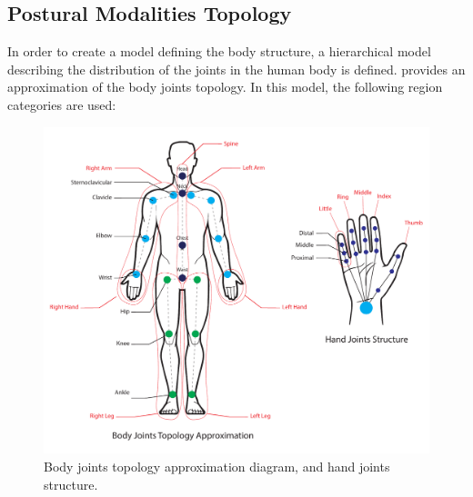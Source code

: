 \pagebreak
\subsection{Postural Modalities Topology}

In order to create a model defining the body structure, a hierarchical model describing the distribution of the joints in the human body is defined.  provides an approximation of the body joints topology. In this model, the following region categories are used:

\begin{figure}[b!]
  \centering
  \includegraphics[width=1\linewidth]{figures/concept/BodyTopology.pdf}
  \captionsetup{justification=centering}
  \caption{Body joints topology approximation diagram, and hand joints structure.}
  \label{fig:intro-BodyTopology}
\end{figure}

